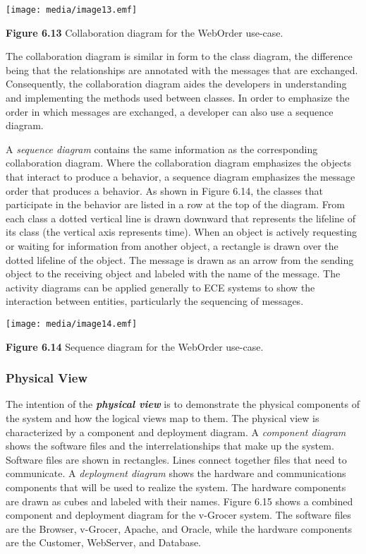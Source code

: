 \texttt{[image: media/image13.emf]}

\textbf{Figure 6.13} Collaboration diagram for the WebOrder use-case.

The collaboration diagram is similar in form to the class diagram, the
difference being that the relationships are annotated with the messages
that are exchanged. Consequently, the collaboration diagram aides the
developers in understanding and implementing the methods used between
classes. In order to emphasize the order in which messages are
exchanged, a developer can also use a sequence diagram.

A \emph{sequence diagram} contains the same information as the
corresponding collaboration diagram. Where the collaboration diagram
emphasizes the objects that interact to produce a behavior, a sequence
diagram emphasizes the message order that produces a behavior. As shown
in Figure 6.14, the classes that participate in the behavior are listed
in a row at the top of the diagram. From each class a dotted vertical
line is drawn downward that represents the lifeline of its class (the
vertical axis represents time). When an object is actively requesting or
waiting for information from another object, a rectangle is drawn over
the dotted lifeline of the object. The message is drawn as an arrow from
the sending object to the receiving object and labeled with the name of
the message. The activity diagrams can be applied generally to ECE
systems to show the interaction between entities, particularly the
sequencing of messages.

\texttt{[image: media/image14.emf]}

\textbf{Figure 6.14} Sequence diagram for the WebOrder use-case.

\subsubsection{Physical View}\label{physical-view}

The intention of the \emph{\textbf{physical view}} is to demonstrate the
physical components of the system and how the logical views map to them.
The physical view is characterized by a component and deployment
diagram. A \emph{component diagram} shows the software files and the
interrelationships that make up the system. Software files are shown in
rectangles. Lines connect together files that need to communicate. A
\emph{deployment diagram} shows the hardware and communications
components that will be used to realize the system. The hardware
components are drawn as cubes and labeled with their names. Figure 6.15
shows a combined component and deployment diagram for the v-Grocer
system. The software files are the Browser, v-Grocer, Apache, and
Oracle, while the hardware components are the Customer, WebServer, and
Database.

